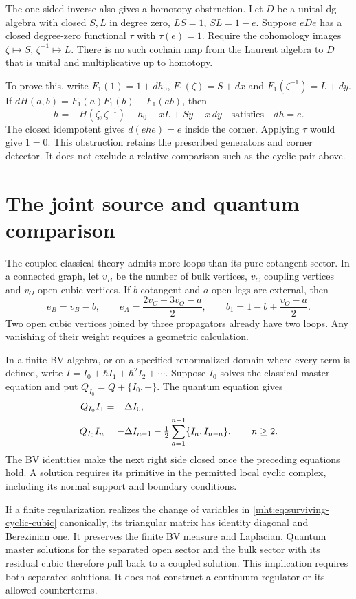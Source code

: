 The one-sided inverse also gives a homotopy obstruction.
Let $D$ be a unital dg algebra with closed $S,L$ in
degree zero, $LS=1$, $SL=1-e$. Suppose $eDe$ has a
closed degree-zero functional $\tau$ with $\tau(e)=1$.
Require the cohomology images $\zeta\mapsto S$, $\zeta^{-1}\mapsto L$.
There is no such cochain map from the Laurent algebra to $D$
that is unital and multiplicative up to homotopy.

To prove this, write
$F_1(1)=1+dh_0$, $F_1(\zeta)=S+dx$ and
$F_1(\zeta^{-1})=L+dy$.
If $dH(a,b)=F_1(a)F_1(b)-F_1(ab)$, then
\[
 h=-H(\zeta,\zeta^{-1})-h_0+xL+Sy+x\,dy
 \quad\text{satisfies}\quad dh=e.
\]
The closed idempotent gives $d(ehe)=e$ inside the corner.
Applying $\tau$ would give $1=0$. This obstruction retains
the prescribed generators and corner detector. It does
not exclude a relative comparison such as the cyclic
pair above.

\section{The joint source and quantum comparison}

The coupled classical theory admits more loops than its
pure cotangent sector. In a connected graph, let $v_B$
be the number of bulk vertices, $v_C$ coupling vertices
and $v_O$ open cubic vertices. If $b$ cotangent and $a$
open legs are external, then
\[
 e_B=v_B-b,\qquad e_A=\frac{2v_C+3v_O-a}{2},\qquad
 b_1=1-b+\frac{v_O-a}{2}.
\]
Two open cubic vertices joined by three propagators
already have two loops. Any vanishing of their weight
requires a geometric calculation.

In a finite BV algebra, or on a specified renormalized
domain where every term is defined, write
$I=I_0+\hbar I_1+\hbar^2I_2+\cdots$.
Suppose $I_0$ solves the classical master equation and
put $Q_{I_0}=Q+\{I_0,-\}$. The quantum equation gives
\begin{align}
 Q_{I_0}I_1&=-\Delta I_0,\notag\\
 Q_{I_0}I_n&=-\Delta I_{n-1}
       -\tfrac12\sum_{a=1}^{n-1}\{I_a,I_{n-a}\},\qquad n\geq2.
       \label{mht:eq:coupled-supported-QME}
\end{align}
The BV identities make the next right side closed once
the preceding equations hold. A solution requires its
primitive in the permitted local cyclic complex, including
its normal support and boundary conditions.

If a finite regularization realizes the change of variables
in \eqref{mht:eq:surviving-cyclic-cubic} canonically, its
triangular matrix has identity diagonal and Berezinian one.
It preserves the finite BV measure and Laplacian.
Quantum master solutions for the separated open sector
and the bulk sector with its residual cubic therefore
pull back to a coupled solution. This implication requires
both separated solutions. It does not construct a
continuum regulator or its allowed counterterms.

